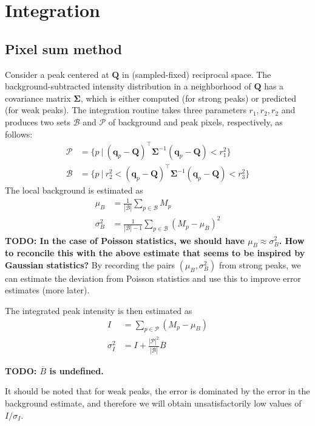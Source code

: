 \documentclass[11pt,a4paper]{article}
\def\v#1{\bm{{#1}}}
\def\tr{^\intercal}
\def\calP{\mathcal{P}}
\def\calB{\mathcal{B}}
\def\q{{\v{q}}}
\begin{document}
\section{Integration} \label{integration}

\subsection{Pixel sum method}

Consider a peak centered at $\v{Q}$ in (sampled-fixed) reciprocal space. The background-subtracted intensity distribution in a neighborhood of $\v{Q}$ has a covariance matrix $\v\Sigma$, which is either computed (for strong peaks) or predicted (for weak peaks). The integration routine takes three parameters $r_1, r_2, r_2$ and produces
two sets $\calB$ and $\calP$ of background and peak pixels, respectively, as follows:
\begin{align}\label{EPeakPixels}
  \calP &= \{ p ~|~ (\q_p-\v{Q})\tr \v\Sigma^{-1} (\q_p-\v{Q}) < r_1^2 \} \\
  \calB &= \{ p ~|~ r_2^2 < (\q_p-\v{Q})\tr \v\Sigma^{-1} (\q_p-\v{Q}) < r_3^2 \}
\end{align}
The local background is estimated as
\begin{align}
  \mu_B &= \frac{1}{|\calB|} \sum_{p \in \calB} M_p \\
  \sigma^2_B &= \frac{1}{|\calB|-1} \sum_{p \in \calB} (M_p - \mu_B)^2
\end{align}
\textbf{TODO: In the case of Poisson statistics, we should have $\mu_B \approx \sigma^2_B$.
How to reconcile this with the above estimate that seems to be inspired by Gaussian statistics?}
By recording the pairs $(\mu_B, \sigma^2_B)$ from strong peaks,
we can estimate the deviation from Poisson statistics
and use this to improve error estimates (more later).

The integrated peak intensity is then estimated as
\begin{align}
  I &= \sum_{p \in \calP} (M_p - \mu_B) \\
  \sigma^2_I &= I + \frac{|\calP|^2}{|\calB|} \overline{B}
\end{align}

\textbf{TODO: $\overline{B}$ is undefined.}

It should be noted that for weak peaks, the error is dominated by the error in the background estimate, and therefore we will obtain unsatisfactorily low values of $I/\sigma_I$.
\end{document}
